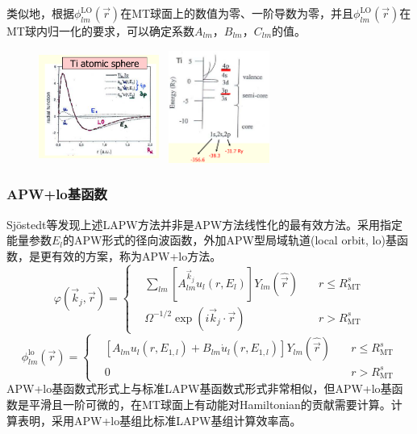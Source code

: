 {{类似地，根据$\phi_{lm}^{\mathrm{LO}}(\vec r)$在\textrm{MT}球面上的数值为零、一阶导数为零，并且$\phi_{lm}^{\mathrm{LO}}(\vec r)$在\textrm{MT}球内归一化的要求，可以确定系数$A_{lm}$，$B_{lm}$，$C_{lm}$的值。
\begin{figure}[h!]
	\vspace{-15pt}
\centering
\hspace{15pt}
\includegraphics[height=1.45in,width=1.55in,viewport=50 10 470 415,clip]{Figures/WIEN2k-lo.png}
\includegraphics[height=1.45in,width=1.45in,viewport=5 1 570 570,clip]{Figures/semi-core.png}
\caption{\tiny \textrm{}}%
\label{Muffin_tin_LO}
\end{figure}
}

\frame
{
\frametitle{\textrm{APW+lo}基函数}
\textrm{Sj\"ostedt}等发现上述\textrm{LAPW}方法并非是\textrm{APW}方法线性化的最有效方法。采用指定能量参数$E_l$的\textrm{APW}形式的径向波函数，外加\textrm{APW}型局域轨道(\textrm{local orbit, lo})基函数，是更有效的方案，称为\textrm{APW+lo}方法。
$$  \varphi(\vec k_j,\vec r)=\left\{
  \begin{aligned}
    &\sum_{lm}[A^{\vec k_j}_{lm}u_l(r,E_l)]Y_{lm}(\hat{\vec r})\quad&r\leqslant R_{\mathrm{MT}}^s\\
    &\Omega^{-1/2}\exp(i\vec k_j\cdot\vec r) &r>R_{\mathrm{MT}}^s
  \end{aligned}\right.
  \label{eq:APW-basis}
$$
$$  \phi_{lm}^{\mathrm{lo}}(\vec r)=\left\{
  \begin{aligned}
  &[A_{lm}u_l(r,E_{1,l})+B_{lm}\dot u_l(r,E_{1,l})]Y_{lm}(\hat{\vec r})\quad&r\leqslant R_{\mathrm{MT}}^s\\
  &0&r>R_{\mathrm{MT}}^s
  \end{aligned}
\right.$$
\textrm{APW+lo}基函数式形式上与标准\textrm{LAPW}基函数式形式非常相似，但\textrm{APW+lo}基函数是平滑且一阶可微的，在\textrm{MT}球面上有动能对\textrm{Hamiltonian}的贡献需要计算。计算表明，采用\textrm{APW+lo}基组比标准\textrm{LAPW}基组计算效率高。
}

}
